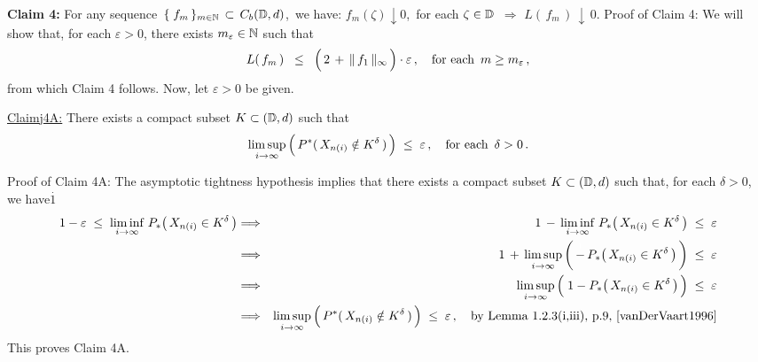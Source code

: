\vskip 0.5cm
\noindent
\textbf{Claim 4:}\;\;
For any sequence \,$\{\;f_{m}\,\}_{m\in\mathbb{N}} \,\subset\, C_{b}(\mathbb{D},d)$,\,
we have:\;
$f_{m}(\zeta) \downarrow 0$,\, for each $\zeta \in \mathbb{D}$
\;\,$\Longrightarrow$\;
$L(\,f_{m}\,) \,\downarrow\, 0$.
\vskip 0.2cm
\noindent
Proof of Claim 4:\;\;
We will show that, for each $\varepsilon > 0$, there exists $m_{\varepsilon} \in \mathbb{N}$ such that
\begin{equation*}
L(\,f_{m}\,)
\;\; \leq \;\;
	\left(\,2 \, \overset{{\color{white}.}}{+} \, \Vert\,f_{1}\,\Vert_{\infty} \,\right) \cdot \varepsilon\,,
\quad
\textnormal{for each \,$m \geq m_{\varepsilon}$}\,,
\end{equation*}
from which Claim 4 follows. Now, let $\varepsilon > 0$ be given.

\vskip 0.8cm
\begin{center}\begin{minipage}{6.5in}
\underline{Claim{{\color{white}j}}4A:}\;\;
There exists a compact subset $K \subset (\mathbb{D},d)$ such that
\begin{equation*}
\underset{i\rightarrow\infty}{\limsup}\left(\,
	P^{*}(\,X_{n(i)} \overset{{\color{white}.}}{\notin} K^{\delta}\,)
\,\right)
\;\leq\; \varepsilon\,,
\quad
\textnormal{for each \,$\delta > 0$}\,.
\end{equation*}
\end{minipage}\end{center}
Proof of Claim 4A:\;\;
The asymptotic tightness hypothesis implies that there exists
a compact subset $K \subset (\mathbb{D},d)$ such that,
for each $\delta > 0$, we have{\color{white}$\overset{.}{1}$}
\begin{eqnarray*}
1 - \varepsilon \; \leq \; \underset{i\rightarrow\infty}{\liminf}\; P_{*}\!\left(\,X_{n(i)} \in K^{\delta}\,\right)
&\Longrightarrow&
	1 \,-\, \underset{i\rightarrow\infty}{\liminf}\; P_{*}\!\left(\,X_{n(i)} \in K^{\delta}\,\right) \;\leq\; \varepsilon
\\
&\Longrightarrow&
	1 \,+\, \underset{i\rightarrow\infty}{\limsup}\left(\,
		\overset{{\color{white}1}}{-}\,P_{*}\!\left(\,X_{n(i)} \in K^{\delta}\,\right)
	\,\right)
	\;\leq\; \varepsilon
\\
&\Longrightarrow&
	\underset{i\rightarrow\infty}{\limsup}\left(\;
		1 \overset{{\color{white}.}}{-} P_{*}\!\left(\,X_{n(i)} \in K^{\delta}\,\right)
	\,\right)
	\;\leq\; \varepsilon
\\
&\Longrightarrow&
	\underset{i\rightarrow\infty}{\limsup}\left(\,
		P^{*}(\,X_{n(i)} \overset{{\color{white}.}}{\notin} K^{\delta}\,)
	\,\right)
	\;\leq\; \varepsilon\,,
	\quad
	\textnormal{by Lemma 1.2.3(i,iii), p.9, \cite{vanDerVaart1996}}
\end{eqnarray*}
This proves Claim 4A.

